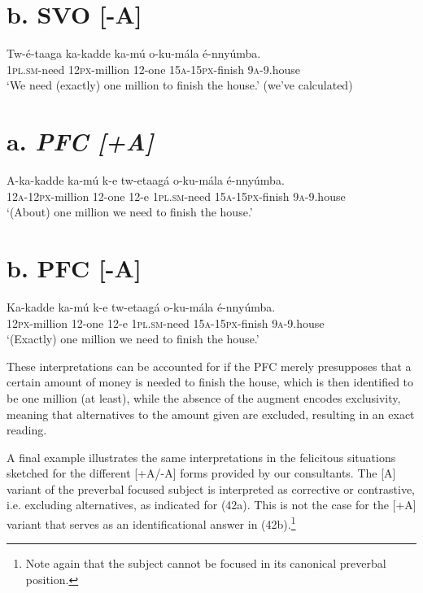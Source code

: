 \documentclass[output=paper]{langsci/langscibook}
\begin{document}
\chapter[b.  SVO [{}-A{]}]{b.  SVO [-A]}
\gll Tw-é-taaga  ka-kadde  ka-mú  o-ku-mála    é-nnyúmba.\\
     \textsc{1pl}.\textsc{sm}{}-need  \textsc{12px}{}-million  12-one  \textsc{15a}{}-\textsc{15px}{}-finish  \textsc{9a}{}-9.house\\
\glt ‘We need (exactly) one million to finish the house.’ (we’ve calculated)
\z

\chapter[a.  PFC [+A{]}]{a.  \textit{PFC [+A]}}
\gll A-ka-kadde  ka-mú  k-e  tw-etaagá  o-ku-mála    é-nnyúmba.\\
     \textsc{12a}{}-\textsc{12px}{}-million  12-one  12-e  \textsc{1pl}.\textsc{sm}{}-need  \textsc{15a}{}-\textsc{15px}{}-finish  \textsc{9a}{}-9.house\\
\glt ‘(About) one million we need to finish the house.’
\z

\chapter[b.  PFC [{}-A{]}]{b.  PFC [-A]}
\gll Ka-kadde    ka-mú  k-e  tw-etaagá  o-ku-mála    é-nnyúmba.\\
     \textsc{12px}{}-million  12-one  12-e  \textsc{1pl}.\textsc{sm}{}-need  \textsc{15a}{}-\textsc{15px}{}-finish  \textsc{9a}{}-9.house\\
\glt ‘(Exactly) one million we need to finish the house.’
\z

These interpretations can be accounted for if the PFC merely presupposes that a certain amount of money is needed to finish the house, which is then identified to be one million (at least), while the absence of the augment encodes exclusivity, meaning that alternatives to the amount given are excluded, resulting in an exact reading.

A final example illustrates the same interpretations in the felicitous situations sketched for the different [+A/-A] forms provided by our consultants. The [A] variant of the preverbal focused subject is interpreted as corrective or contrastive, i.e. excluding alternatives, as indicated for (42a). This is not the case for the [+A] variant that serves as an identificational answer in (42b).\footnote{ Note again that the subject cannot be focused in its canonical preverbal position.}
\end{document}
